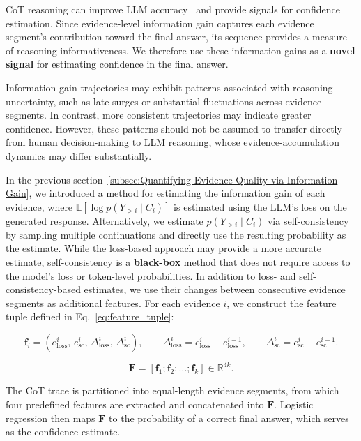 \documentclass{article} %
\begin{document}
CoT reasoning can improve LLM accuracy~\cite{wei2022chain} and provide signals for confidence estimation. Since evidence-level information gain captures each evidence segment's contribution toward the final answer, its sequence provides a measure of reasoning informativeness. We therefore use these information gains as a \textbf{novel signal} for estimating confidence in the final answer.

Information-gain trajectories may exhibit patterns associated with reasoning uncertainty, such as late surges or substantial fluctuations across evidence segments. In contrast, more consistent trajectories may indicate greater confidence. However, these patterns should not be assumed to transfer directly from human decision-making to LLM reasoning, whose evidence-accumulation dynamics may differ substantially.

In the previous section~\ref{subsec:Quantifying Evidence Quality via Information Gain}, we introduced a method for estimating the information gain of each evidence, where
$\mathbb{E}\!\left[\log p\!\left(Y_{>i}\mid C_i\right)\right]$
is estimated using the LLM's loss on the generated response. Alternatively, we estimate
$p\!\left(Y_{>i}\mid C_i\right)$ via self-consistency by sampling multiple continuations and directly use the resulting probability as the estimate. While the loss-based approach may provide a more accurate estimate, self-consistency is a \textbf{black-box} method that does not require access to the model's loss or token-level probabilities. In addition to loss- and self-consistency-based estimates, we use their changes between consecutive evidence segments as additional features. For each evidence $i$, we construct the feature tuple defined in Eq.~\ref{eq:feature_tuple}:

\begin{equation}
\mathbf{f}_i =
\left(
e_{\mathrm{loss}}^i,\,
e_{\mathrm{sc}}^i,\,
\Delta_{\mathrm{loss}}^i,\,
\Delta_{\mathrm{sc}}^i
\right),
\qquad
\Delta_{\mathrm{loss}}^i =
e_{\mathrm{loss}}^i - e_{\mathrm{loss}}^{i-1},
\qquad
\Delta_{\mathrm{sc}}^i =
e_{\mathrm{sc}}^i - e_{\mathrm{sc}}^{i-1}.
\label{eq:feature_tuple}
\end{equation}


\begin{equation}
\mathbf{F} =
\left[
\mathbf{f}_1;\mathbf{f}_2;\ldots;\mathbf{f}_k
\right]
\in \mathbb{R}^{4k}.
\label{eq:feature_vector}
\end{equation}

The CoT trace is partitioned into equal-length evidence segments, from which four predefined features are extracted and concatenated into $\mathbf{F}$. Logistic regression then maps $\mathbf{F}$ to the probability of a correct final answer, which serves as the confidence estimate.
\end{document}
